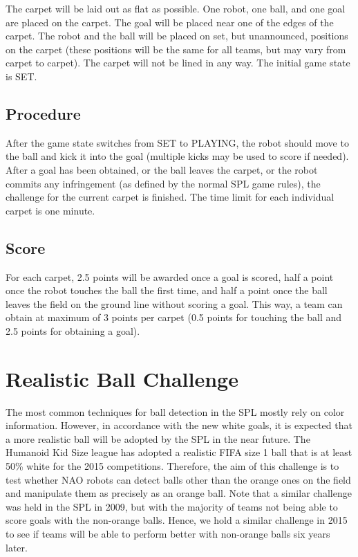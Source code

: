 \documentclass[12pt]{article}
\begin{document}
The carpet will be laid out as flat as possible.  One robot, one ball, and one goal are placed on the carpet. The goal will be placed near one of the edges of the carpet. The robot and the ball will be placed on set, but unannounced, positions on the carpet (these positions will be the same for all teams, but may vary from carpet to carpet).  The carpet will not be lined in any way.  The initial game state is SET.

\subsection{Procedure}

After the game state switches from SET to PLAYING, the robot should move to the ball and kick it into the goal (multiple kicks may be used to score if needed). After a goal has been obtained, or the ball leaves the carpet, or the robot commits any infringement (as defined by the normal SPL game rules), the challenge for the current carpet is finished. The time limit for each individual carpet is one minute. 

\subsection{Score}

For each carpet, 2.5 points will be awarded once a goal is scored, half a point once the robot touches the ball the first time, and half a point once the ball leaves the field on the ground line without scoring a goal. This way, a team can obtain at maximum of 3 points per carpet (0.5 points for touching the ball and 2.5 points for obtaining a goal).

\newpage






\section{Realistic Ball Challenge}

The most common techniques for ball detection in the SPL mostly rely on color information. However, in accordance with the new white goals, it is expected that a more realistic ball will be adopted by the SPL in the near future.  The Humanoid Kid Size league has adopted a realistic FIFA size 1 ball that is at least 50\% white for the 2015 competitions.  Therefore, the aim of this challenge is to test whether NAO robots can detect balls other than the orange ones on the field and manipulate them as precisely as an orange ball.  Note that a similar challenge was held in the SPL in 2009, but with the majority of teams not being able to score goals with the non-orange balls.  Hence, we hold a similar challenge in 2015 to see if teams will be able to perform better with non-orange balls six years later.
\end{document}
